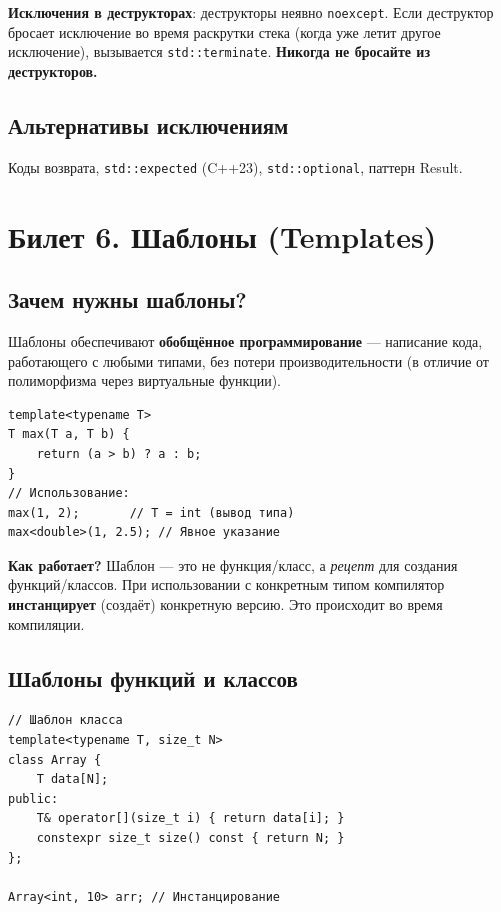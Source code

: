 \documentclass[12pt,a4paper]{article}
\begin{document}
\textbf{Исключения в деструкторах}: деструкторы неявно \texttt{noexcept}. Если деструктор бросает исключение во время раскрутки стека (когда уже летит другое исключение), вызывается \texttt{std::terminate}. \textbf{Никогда не бросайте из деструкторов.}

\subsection{Альтернативы исключениям}

Коды возврата, \texttt{std::expected} (C++23), \texttt{std::optional}, паттерн Result.

\section{Билет 6. Шаблоны (Templates)}

\subsection{Зачем нужны шаблоны?}

Шаблоны обеспечивают \textbf{обобщённое программирование} --- написание кода, работающего с любыми типами, без потери производительности (в отличие от полиморфизма через виртуальные функции).

\begin{lstlisting}
template<typename T>
T max(T a, T b) {
    return (a > b) ? a : b;
}
// Использование:
max(1, 2);       // T = int (вывод типа)
max<double>(1, 2.5); // Явное указание
\end{lstlisting}

\textbf{Как работает?} Шаблон --- это не функция/класс, а \textit{рецепт} для создания функций/классов. При использовании с конкретным типом компилятор \textbf{инстанцирует} (создаёт) конкретную версию. Это происходит во время компиляции.

\subsection{Шаблоны функций и классов}

\begin{lstlisting}
// Шаблон класса
template<typename T, size_t N>
class Array {
    T data[N];
public:
    T& operator[](size_t i) { return data[i]; }
    constexpr size_t size() const { return N; }
};

Array<int, 10> arr; // Инстанцирование
\end{lstlisting}
\end{document}
